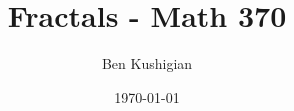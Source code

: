 \documentclass[11pt,oneside,final]{book}
\begin{document}
\title{{\sc Fractals - Math 370}}
\author{Ben Kushigian}
\date{\today}
\maketitle
\tableofcontents























\clearpage
{}
\label{index}
\printindex

\end{document}
